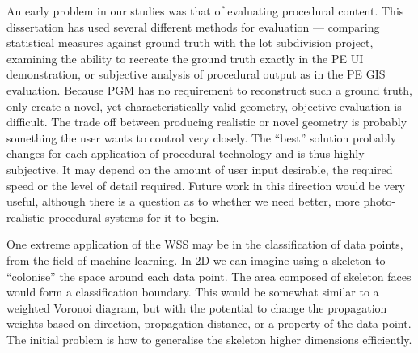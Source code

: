 An early problem in our studies was that of evaluating procedural content. This dissertation has used several different methods for evaluation --- comparing statistical measures against ground truth with the lot subdivision project, examining the ability to recreate the ground truth exactly in the PE UI demonstration, or subjective analysis of procedural output as in the PE GIS evaluation. Because PGM has no requirement to reconstruct such a ground truth, only create a novel, yet characteristically valid geometry, objective evaluation is difficult. The trade off between producing realistic or novel geometry is probably something the user wants to control very closely.  The ``best'' solution probably changes for each application of procedural technology and is thus highly subjective. It may depend on the amount of user input desirable, the required speed or the level of detail required. Future work in this direction would be very useful, although there is a question as to whether we need better, more photo-realistic procedural systems for it to begin. 

One extreme application of the WSS may be in the classification of data points, from the field of machine learning. In 2D we can imagine using a skeleton to ``colonise'' the space around each data point. The area composed of skeleton faces would form a classification boundary. This would be somewhat similar to a weighted Voronoi diagram, but with the potential to change the propagation weights based on direction, propagation distance, or a property of the data point. The initial problem is how to generalise the skeleton higher dimensions efficiently.



